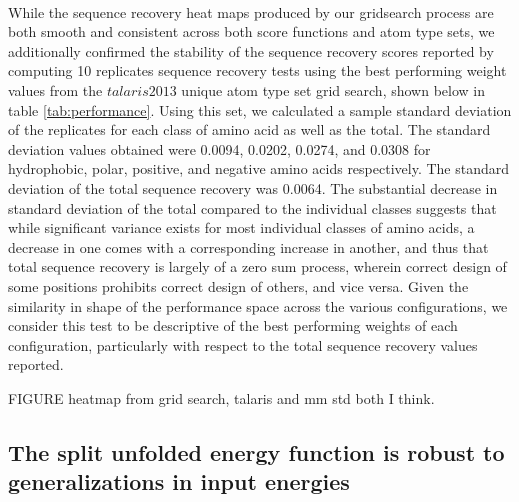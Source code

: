 \paragraph{}
While the sequence recovery heat maps produced by our gridsearch process are both smooth and consistent across both score functions and atom type sets, we additionally confirmed the stability of the sequence recovery scores reported by computing 10 replicates sequence recovery tests using the best performing weight values from the $talaris2013$ unique atom type set grid search, shown below in table \ref{tab:performance}.
Using this set, we calculated a sample standard deviation of the replicates for each class of amino acid as well as the total. 
The standard deviation values obtained were 0.0094, 0.0202, 0.0274, and 0.0308 for hydrophobic, polar, positive, and negative amino acids respectively.
The standard deviation of the total sequence recovery was 0.0064.
The substantial decrease in standard deviation of the total compared to the individual classes suggests that while significant variance exists for most individual classes of amino acids, a decrease in one comes with a corresponding increase in another, and thus that total sequence recovery is largely of a zero sum process, wherein correct design of some positions prohibits correct design of others, and vice versa.
Given the similarity in shape of the performance space across the various configurations, we consider this test to be descriptive of the best performing weights of each configuration, particularly with respect to the total sequence recovery values reported.


FIGURE heatmap from grid search, talaris and mm std both I think.

\subsection{The split unfolded energy function is robust to generalizations in input energies}
